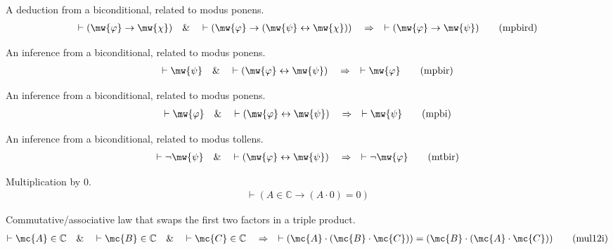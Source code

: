 \begin{lemma} {A deduction from a biconditional}, related to
modus ponens.  
\begin{align}
\vdash ( \mw{\varphi} \rightarrow \mw{\chi} )\quad\&\quad \vdash ( \mw{\varphi}
    \rightarrow ( \mw{\psi} \leftrightarrow \mw{\chi} ) )\quad\Rightarrow\quad
    \vdash ( \mw{\varphi} \rightarrow \mw{\psi} )\label{eq:mpbird}\tag{mpbird}
\end{align}
\end{lemma}


\begin{lemma} {An inference from a biconditiona}l, related to
modus ponens.
\begin{align}
\vdash \mw{\psi}\quad\&\quad \vdash ( \mw{\varphi} \leftrightarrow \mw{\psi}
    )\quad\Rightarrow\quad \vdash \mw{\varphi}\label{eq:mpbir}\tag{mpbir}
\end{align}
\end{lemma}


\begin{lemma} {An inference from a biconditional}, related to
modus ponens.
\begin{align}
\vdash \mw{\varphi}\quad\&\quad \vdash ( \mw{\varphi} \leftrightarrow \mw{\psi}
    )\quad\Rightarrow\quad \vdash \mw{\psi}\label{eq:mpbi}\tag{mpbi}
\end{align}
\end{lemma}


\begin{lemma}  {An inference from a biconditional, related to
modus tollens.}
\begin{align}
\vdash \lnot \mw{\psi}\quad\&\quad \vdash ( \mw{\varphi} \leftrightarrow
    \mw{\psi} )\quad\Rightarrow\quad \vdash \lnot
    \mw{\varphi}\label{eq:mtbir}\tag{mtbir}
\end{align}
\end{lemma}


\begin{lemma} {Multiplication by $0$.}
\begin{align}
\vdash ( A \in \mathbb{C} \rightarrow ( A \cdot 0 ) = 0
    )\label{eq:mul01}\tag{mul01}
\end{align}
\end{lemma}


\begin{lemma} {Commutative/associative law that swaps the
first two factors in a triple
       product.} %
\begin{align}
\vdash \mc{A} \in \mathbb{C}\quad\&\quad \vdash \mc{B} \in \mathbb{C}\quad\&\quad \vdash
    \mc{C} \in \mathbb{C}\quad\Rightarrow\quad \vdash ( \mc{A} \cdot ( \mc{B} \cdot \mc{C} ) ) = (
    \mc{B} \cdot ( \mc{A} \cdot \mc{C} ) )\label{eq:mul12i}\tag{mul12i}
\end{align}
\end{lemma}


